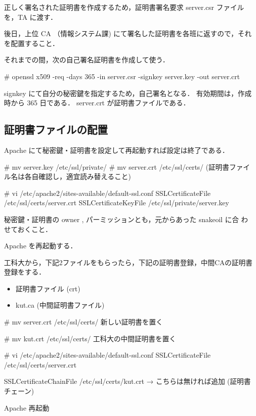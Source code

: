 正しく署名された証明書を作成するため，証明書署名要求 server.csr ファイル
を，TA に渡す．

後日，上位 CA （情報システム課) にて署名した証明書を各班に返すので，それ
を配置すること．

それまでの間，次の自己署名証明書を作成して使う．

\begin{cli}
# openssl x509 -req -days 365 -in server.csr -signkey server.key -out server.crt

signkey にて自分の秘密鍵を指定するため，自己署名となる．
有効期間は，作成時から 365 日である．
server.crt が証明書ファイルである．
\end{cli}

\subsection{証明書ファイルの配置}

Apache にて秘密鍵・証明書を設定して再起動すれば設定は終了である．

\begin{cli}
# mv server.key /etc/ssl/private/
# mv server.crt /etc/ssl/certs/
(証明書ファイル名は各自確認し，適宜読み替えること)

# vi /etc/apache2/sites-available/default-ssl.conf
SSLCertificateFile      /etc/ssl/certs/server.crt
SSLCertificateKeyFile /etc/ssl/private/server.key

秘密鍵・証明書の owner , パーミッションとも，元からあった snakeoil に合
わせておくこと．

Apache を再起動する．
\end{cli}

工科大から，下記2ファイルをもらったら，下記の証明書登録，中間CAの証明書
登録をする．

\begin{itemize}
    \item 証明書ファイル (crt)
    \item kut.ca (中間証明書ファイル)
\end{itemize}

\begin{cli}
# mv server.crt /etc/ssl/certs/
 新しい証明書を置く

# mv kut.crt /etc/ssl/certs/
 工科大の中間証明書を置く

# vi /etc/apache2/sites-available/default-ssl.conf
SSLCertificateFile      /etc/ssl/certs/server.crt

SSLCertificateChainFile /etc/ssl/certs/kut.crt
→ こちらは無ければ追加 (証明書チェーン)

Apache 再起動

\end{cli}

